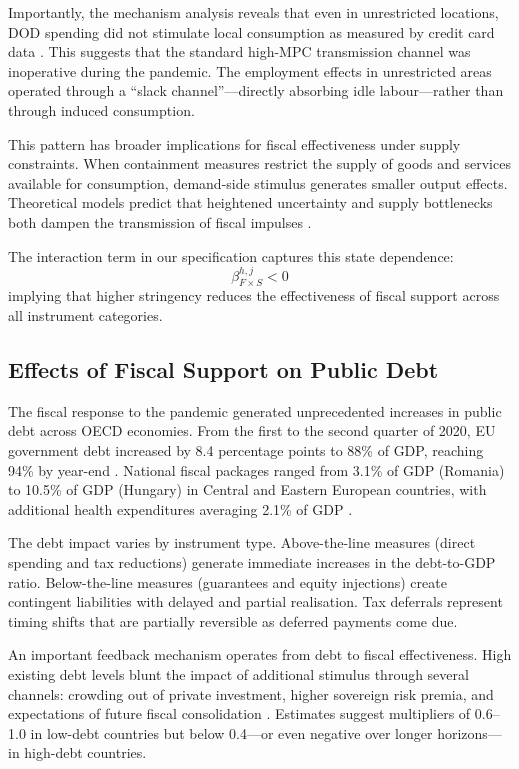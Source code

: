 \documentclass[12pt, a4paper]{article}
\begin{document}
Importantly, the mechanism analysis reveals that even in unrestricted locations, DOD spending did not stimulate local consumption as measured by credit card data \citep{Chetty2020}. This suggests that the standard high-MPC transmission channel was inoperative during the pandemic. The employment effects in unrestricted areas operated through a ``slack channel''---directly absorbing idle labour---rather than through induced consumption.

This pattern has broader implications for fiscal effectiveness under supply constraints. When containment measures restrict the supply of goods and services available for consumption, demand-side stimulus generates smaller output effects. Theoretical models predict that heightened uncertainty and supply bottlenecks both dampen the transmission of fiscal impulses \citep{Guerrieri2022}.

The interaction term in our specification captures this state dependence:
\begin{equation}
    \beta^{h,j}_{F \times S} < 0
\end{equation}
implying that higher stringency reduces the effectiveness of fiscal support across all instrument categories.

\subsection{Effects of Fiscal Support on Public Debt}
\label{subsec:fiscal_debt}

The fiscal response to the pandemic generated unprecedented increases in public debt across OECD economies. From the first to the second quarter of 2020, EU government debt increased by 8.4 percentage points to 88\% of GDP, reaching 94\% by year-end \citep{Eurostat2021}. National fiscal packages ranged from 3.1\% of GDP (Romania) to 10.5\% of GDP (Hungary) in Central and Eastern European countries, with additional health expenditures averaging 2.1\% of GDP \citep{Haug2021}.

The debt impact varies by instrument type. Above-the-line measures (direct spending and tax reductions) generate immediate increases in the debt-to-GDP ratio. Below-the-line measures (guarantees and equity injections) create contingent liabilities with delayed and partial realisation. Tax deferrals represent timing shifts that are partially reversible as deferred payments come due.

An important feedback mechanism operates from debt to fiscal effectiveness. High existing debt levels blunt the impact of additional stimulus through several channels: crowding out of private investment, higher sovereign risk premia, and expectations of future fiscal consolidation \citep{Ilzetzki2013}. Estimates suggest multipliers of 0.6--1.0 in low-debt countries but below 0.4---or even negative over longer horizons---in high-debt countries.
\end{document}
